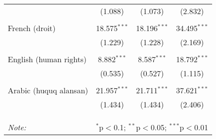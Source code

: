 \begin{table}[!htbp]
\begin{tabular}{@{\extracolsep{5pt}}lccc}
  & (1.088) & (1.073) & (2.832) \\ 
  & & & \\ 
 French (droit) & 18.575$^{***}$ & 18.196$^{***}$ & 34.495$^{***}$ \\ 
  & (1.229) & (1.228) & (2.169) \\ 
  & & & \\ 
 English (human rights) & 8.882$^{***}$ & 8.587$^{***}$ & 18.792$^{***}$ \\ 
  & (0.535) & (0.527) & (1.115) \\ 
  & & & \\ 
 Arabic (huquq alansan) & 21.957$^{***}$ & 21.711$^{***}$ & 37.621$^{***}$ \\ 
  & (1.434) & (1.434) & (2.406) \\ 
  & & & \\ 
\hline \\[-1.8ex] 
\hline 
\hline \\[-1.8ex] 
\textit{Note:}  & \multicolumn{3}{r}{$^{*}$p$<$0.1; $^{**}$p$<$0.05; $^{***}$p$<$0.01} \\ 
\end{tabular} 
\end{table} 
